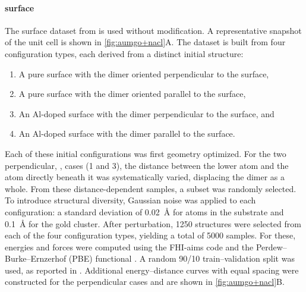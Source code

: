 \documentclass[10pt]{article} %
\begin{document}
\paragraph{ surface}
The  surface dataset from \cite{kfgb2021} is used without modification. A representative snapshot of the unit cell is shown in \cref{fig:aumgo+nacl}A. The dataset is built from four configuration types, each derived from a distinct initial structure:
%
\begin{enumerate}
\item A pure  surface with the  dimer oriented perpendicular to the surface,
\item A pure  surface with the  dimer oriented parallel to the surface,
\item An Al-doped  surface with the  dimer perpendicular to the surface, and
\item An Al-doped  surface with the  dimer parallel to the surface.
\end{enumerate}
%
Each of these initial configurations was first geometry optimized. For the two perpendicular, , cases (1 and 3), the distance between the lower  atom and the  atom directly beneath it was systematically varied, displacing the  dimer as a whole. From these distance-dependent samples, a subset was randomly selected.
%
To introduce structural diversity, Gaussian noise was applied to each configuration: a standard deviation of \qty{0.02}{\angstrom} for atoms in the  substrate and \qty{0.1}{\angstrom} for the gold cluster. After perturbation, \num{1250} structures were selected from each of the four configuration types, yielding a total of \num{5000} samples. For these, energies and forces were computed using the FHI-aims code \citep{aaazzz2025pre} and the Perdew–Burke–Ernzerhof (PBE) functional \citep{pbe1996}.
%
A random \num{90}/\num{10} train–validation split was used, as reported in \cite{kfgb2021}. Additional energy–distance curves with equal spacing were constructed for the perpendicular cases and are shown in \cref{fig:aumgo+nacl}B.
\end{document}
